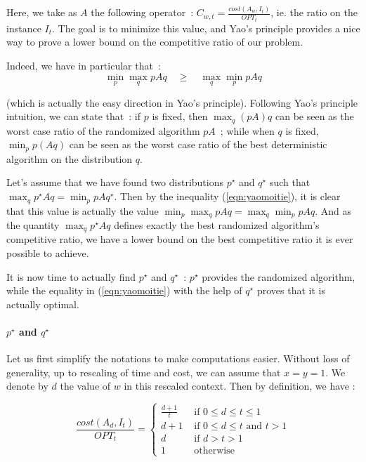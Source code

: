 Here, we take as $A$ the following operator~: $C_{w,t} = \frac{cost(A_w, I_t)}{OPT_t}$, ie. the ratio on the instance $I_t$. The goal is to minimize this value, and Yao's principle provides a nice way to prove a lower bound on the competitive ratio of our problem.

Indeed, we have in particular that~:
\begin{equation} \label{eqn:yaomoitie}
\min_p \max_q p A q \quad \geq \quad \max_q \min_p p A q
\end{equation}

(which is actually the easy direction in Yao's principle). Following Yao's principle intuition, we can state that~: if $p$ is fixed, then $\max_q (pA)q$ can be seen as the worst case ratio of the randomized algorithm $pA$~; while when $q$ is fixed, $\min_p p(Aq)$ can be seen as the worst case ratio of the best deterministic algorithm on the distribution $q$.

Let's assume that we have found two distributions $p^\star$ and $q^\star$ such that $\max_q p^\star A q = \min_p p A q^\star$. Then by the inequality (\ref{eqn:yaomoitie}), it is clear that this value is actually the value $\min_p \max_q p A q = \max_q \min_p p A q$. And as the quantity $\max_q p^\star A q$ defines exactly the best randomized algorithm's competitive ratio, we have a lower bound on the best competitive ratio it is ever possible to achieve.

It is now time to actually find $p^\star$ and $q^\star$~: $p^\star$ provides the randomized algorithm, while the equality in (\ref{eqn:yaomoitie}) with the help of $q^\star$ proves that it is actually optimal.


\paragraph{$p^\star$ and $q^\star$}

Let us first simplify the notations to make computations easier. Without loss of generality, up to rescaling of time and cost, we can assume that $x=y=1$. We denote by $d$ the value of $w$ in this rescaled context. Then by definition, we have :

\begin{equation} \label{eq:eq1} \frac{cost(A_d,I_t)}{OPT_t} = \left\{\begin{array}{ll}
 \frac{d+1}{t}  & \text{ if }0 \leq d \leq t \leq 1 \\
 d+1 & \text{ if } 0 \leq d \leq t \text{ and } t >1 \\
 d & \text{ if } d >t>1 \\
 1 & \text{ otherwise } \end{array}\right. \end{equation}


